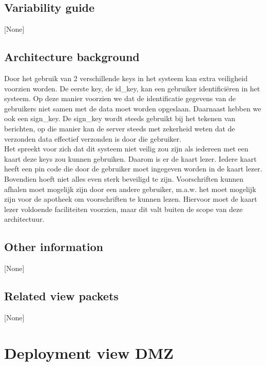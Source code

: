\documentclass[a4paper,10pt]{article}
\begin{document}
\subsection{Variability guide}
[None]

\subsection{Architecture background}
Door het gebruik van 2 verschillende keys in het systeem kan extra veiligheid voorzien worden.  De eerste key, de id\_key, kan een gebruiker identifici\"{e}ren in het systeem.  Op deze manier voorzien we dat de identificatie gegevens van de gebruikers niet samen met de data moet worden opgeslaan.  Daarnaast hebben we ook een sign\_key.  De sign\_key wordt steeds gebruikt bij het tekenen van berichten, op die manier kan de server steeds met zekerheid weten dat de verzonden data effectief verzonden is door die gebruiker.\\
Het spreekt voor zich dat dit systeem niet veilig zou zijn als iedereen met een kaart deze keys zou kunnen gebruiken.  Daarom is er de kaart lezer.  Iedere kaart heeft een pin code die door de gebruiker moet ingegeven worden in de kaart lezer.  Bovendien hoeft niet alles even sterk beveiligd te zijn.  Voorschriften kunnen afhalen moet mogelijk zijn door een andere gebruiker, m.a.w. het moet mogelijk zijn voor de apotheek om voorschriften te kunnen lezen.  Hiervoor moet de kaart lezer voldoende faciliteiten voorzien, maar dit valt buiten de scope van deze architectuur.

\subsection{Other information}
[None]

\subsection{Related view packets}
[None]

\clearpage
\section{Deployment view DMZ}
\label{sec:deploymentView:DMZ}
\end{document}
